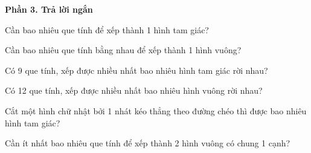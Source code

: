 \textbf{Phần 3. Trả lời ngắn}

\begin{ex} %
Cần bao nhiêu que tính để xếp thành 1 hình tam giác?
\end{ex}

\begin{ex} %
Cần bao nhiêu que tính bằng nhau để xếp thành 1 hình vuông?
\end{ex}

\begin{ex} %
Có 9 que tính, xếp được nhiều nhất bao nhiêu hình tam giác rời nhau?
\end{ex}

\begin{ex} %
Có 12 que tính, xếp được nhiều nhất bao nhiêu hình vuông rời nhau?
\end{ex}

\begin{ex} %
Cắt một hình chữ nhật bởi 1 nhát kéo thẳng theo đường chéo thì được bao nhiêu hình tam giác?
\end{ex}

\begin{ex} %
Cần ít nhất bao nhiêu que tính để xếp thành 2 hình vuông có chung 1 cạnh?
\end{ex}
